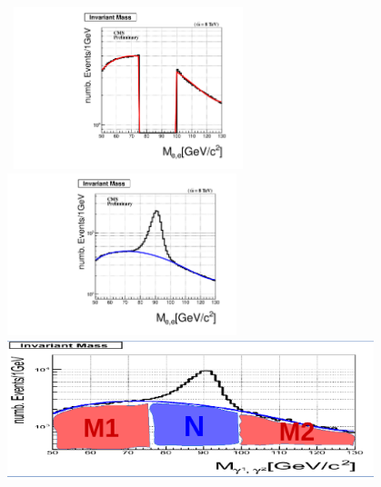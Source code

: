 \begin{minipage}{\linewidth} 
\begin{center}
\mbox{
\includegraphics[height=0.50\textwidth, width=0.5\textwidth]{THESISPLOTS/Uncleaned-di-Photon-ZMass-Fit-DoubleElectron-Run2012A.pdf}
\includegraphics[height=0.50\textwidth, width=0.5\textwidth]{THESISPLOTS/Background_In_ZMass-From-Di-Photon.pdf}}
\mbox{
\includegraphics[height=0.55\textwidth, width=0.8\textwidth]{THESISPLOTS/ZBackground_SF.png}
}
\label{fig:collZ}
\end{center}
\end{minipage}


